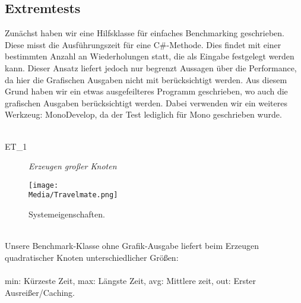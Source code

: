 %



\newpage



\label{Abschnitt:Tests:Protokoll:Extrem}



\subsection*{Extremtests}


Zunächst haben wir eine Hilfsklasse für einfaches Benchmarking geschrieben. Diese misst die Ausführungszeit für eine C\#-Methode. Dies findet mit einer bestimmten Anzahl an Wiederholungen statt, die als Eingabe festgelegt werden kann. Dieser Ansatz liefert jedoch nur begrenzt Aussagen über die Performance, da hier die Grafischen Ausgaben nicht mit berücksichtigt werden. Aus diesem Grund haben wir ein etwas ausgefeilteres Programm geschrieben, wo auch die grafischen Ausgaben berücksichtigt werden. Dabei verwenden wir ein weiteres Werkzeug: MonoDevelop, da der Test lediglich für Mono geschrieben wurde.\\~\\


\label{Abschnitt:Tests:Protokoll:Extrem:Knoten_Erzeugen}

\begin{description}

	\item[ET\_1] \textit{Erzeugen großer Knoten}\hfill\\
	
\end{description}


\begin{figure}[ht]

	\centering
	\label{Anhang:Medien:Travelmate}
	
	\texttt{[image: \\Media/Travelmate.png]}
	
	\caption{Systemeigenschaften.}

\end{figure}

~\\

Unsere Benchmark-Klasse ohne Grafik-Ausgabe liefert beim Erzeugen quadratischer Knoten unterschiedlicher Größen:\\~\\

\noindent
min: Kürzeste Zeit, max: Längste Zeit, avg: Mittlere zeit, out: Erster Ausreißer/Caching.\\


